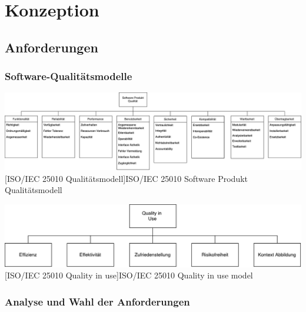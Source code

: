 \section{Konzeption}

\subsection{Anforderungen}

\subsubsection{Software-Qualitätsmodelle}





\vspace{1em}
\begin{minipage}{\linewidth}
	\centering
	\includegraphics[width=0.9\linewidth]{Konzeption/Bilder/ISO25010_Modell.pdf}
	[ISO/IEC 25010 Qualitätsmodell]{ISO/IEC 25010 Software Produkt Qualitätsmodell}
	\label{fig:iso25010}
\end{minipage}

\vspace{1em}
\begin{minipage}{\linewidth}
	\centering
	\includegraphics[width=0.9\linewidth]{Konzeption/Bilder/QualityInUse.pdf}
	[ISO/IEC 25010 Quality in use]{ISO/IEC 25010 Quality in use model}
	\label{fig:iso25010qiu}
\end{minipage}
 
\subsubsection{Analyse und Wahl der Anforderungen}


